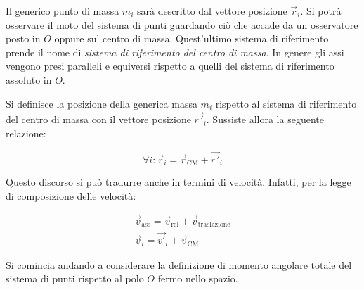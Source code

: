 \begin{figure}[htpb]
\end{figure}
\FloatBarrier
Il generico punto di massa $m_i$ sarà descritto dal vettore posizione $\vec{r}_i$. Si potrà osservare il moto del sistema di punti guardando ciò che accade da un osservatore posto in $O$ oppure sul centro di massa. Quest'ultimo sistema di riferimento prende il nome di \emph{sistema di riferimento del centro di massa}. In genere gli assi vengono presi paralleli e equiversi rispetto a quelli del sistema di riferimento assoluto in $O$.

Si definisce la posizione della generica massa $m_i$ rispetto al sistema di riferimento del centro di massa con il vettore posizione $\vec{r\,'}_i$. Sussiste allora la seguente relazione:

\[
	\forall i: \vec{r}_i = \vec{r}_\text{CM} + \vec{r\,'}_i
\]

Questo discorso si può tradurre anche in termini di velocità. Infatti, per la legge di composizione delle velocità:

\begin{gather*}
	\vec{v}_{\text{ass} } = \vec{v}_{\text{rel} } + \vec{v}_{\text{traslazione}}\\
	\vec{v}_i = \vec{v'}_i + \vec{v}_\text{CM}
\end{gather*}

Si comincia andando a considerare la definizione di momento angolare totale del sistema di punti rispetto al polo $O$ fermo nello spazio.

